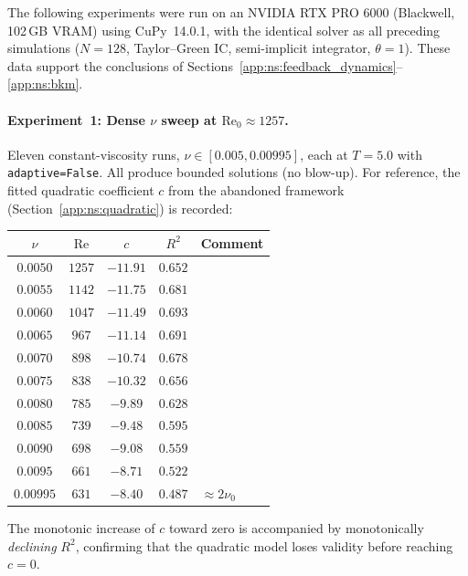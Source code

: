 The following experiments were run on an NVIDIA RTX PRO 6000
(Blackwell, 102\,GB VRAM) using CuPy~14.0.1, with the
identical solver as all preceding simulations ($N=128$,
Taylor--Green IC, semi-implicit integrator, $\theta=1$).
These data support the conclusions of
Sections~\ref{app:ns:feedback_dynamics}--\ref{app:ns:bkm}.

\paragraph{Experiment~1: Dense $\nu$ sweep at $\mathrm{Re}_0
\approx 1257$.}
Eleven constant-viscosity runs, $\nu \in [0.005, 0.00995]$,
each at $T=5.0$ with \texttt{adaptive=False}.  All produce
bounded solutions (no blow-up).  For reference, the fitted
quadratic coefficient $c$ from the abandoned framework
(Section~\ref{app:ns:quadratic}) is recorded:
\begin{center}
\begin{tabular}{@{}ccccl@{}}
\toprule
$\nu$ & $\mathrm{Re}$ & $c$ & $R^2$ & Comment \\
\midrule
$0.0050$ & $1257$ & $-11.91$ & $0.652$ & \\
$0.0055$ & $1142$ & $-11.75$ & $0.681$ & \\
$0.0060$ & $1047$ & $-11.49$ & $0.693$ & \\
$0.0065$ &  $967$ & $-11.14$ & $0.691$ & \\
$0.0070$ &  $898$ & $-10.74$ & $0.678$ & \\
$0.0075$ &  $838$ & $-10.32$ & $0.656$ & \\
$0.0080$ &  $785$ & $-9.89$  & $0.628$ & \\
$0.0085$ &  $739$ & $-9.48$  & $0.595$ & \\
$0.0090$ &  $698$ & $-9.08$  & $0.559$ & \\
$0.0095$ &  $661$ & $-8.71$  & $0.522$ & \\
$0.00995$&  $631$ & $-8.40$  & $0.487$ & $\approx 2\nu_0$ \\
\bottomrule
\end{tabular}
\end{center}
The monotonic increase of $c$ toward zero is accompanied
by monotonically \emph{declining} $R^2$, confirming that
the quadratic model loses validity before reaching $c = 0$.

